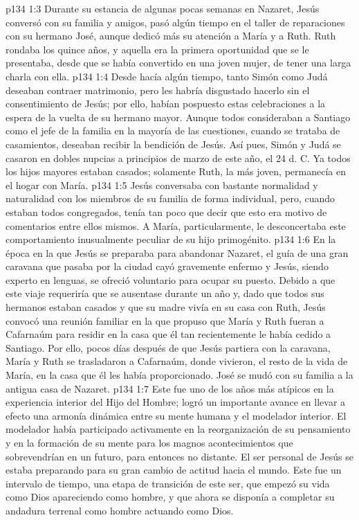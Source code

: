 \vs p134 1:3 Durante su estancia de algunas pocas semanas en Nazaret, Jesús conversó con su familia y amigos, pasó algún tiempo en el taller de reparaciones con su hermano José, aunque dedicó más su atención a María y a Ruth. Ruth rondaba los quince años, y aquella era la primera oportunidad que se le presentaba, desde que se había convertido en una joven mujer, de tener una larga charla con ella.
\vs p134 1:4 Desde hacía algún tiempo, tanto Simón como Judá deseaban contraer matrimonio, pero les habría disgustado hacerlo sin el consentimiento de Jesús; por ello, habían pospuesto estas celebraciones a la espera de la vuelta de su hermano mayor. Aunque todos consideraban a Santiago como el jefe de la familia en la mayoría de las cuestiones, cuando se trataba de casamientos, deseaban recibir la bendición de Jesús. Así pues, Simón y Judá se casaron en dobles nupcias a principios de marzo de este año, el 24 d. C. Ya todos los hijos mayores estaban casados; solamente Ruth, la más joven, permanecía en el hogar con María.
\vs p134 1:5 Jesús conversaba con bastante normalidad y naturalidad con los miembros de su familia de forma individual, pero, cuando estaban todos congregados, tenía tan poco que decir que esto era motivo de comentarios entre ellos mismos. A María, particularmente, le desconcertaba este comportamiento inusualmente peculiar de su hijo primogénito.
\vs p134 1:6 En la época en la que Jesús se preparaba para abandonar Nazaret, el guía de una gran caravana que pasaba por la ciudad cayó gravemente enfermo y Jesús, siendo experto en lenguas, se ofreció voluntario para ocupar su puesto. Debido a que este viaje requeriría que se ausentase durante un año y, dado que todos sus hermanos estaban casados y que su madre vivía en su casa con Ruth, Jesús convocó una reunión familiar en la que propuso que María y Ruth fueran a Cafarnaúm para residir en la casa que él tan recientemente le había cedido a Santiago. Por ello, pocos días después de que Jesús partiera con la caravana, María y Ruth se trasladaron a Cafarnaúm, donde vivieron, el resto de la vida de María, en la casa que él les había proporcionado. José se mudó con su familia a la antigua casa de Nazaret.
\vs p134 1:7 Este fue uno de los años más atípicos en la experiencia interior del Hijo del Hombre; logró un importante avance en llevar a efecto una armonía dinámica entre su mente humana y el modelador interior. El modelador había participado activamente en la reorganización de su pensamiento y en la formación de su mente para los magnos acontecimientos que sobrevendrían en un futuro, para entonces no distante. El ser personal de Jesús se estaba preparando para su gran cambio de actitud hacia el mundo. Este fue un intervalo de tiempo, una etapa de transición de este ser, que empezó su vida como Dios apareciendo como hombre, y que ahora se disponía a completar su andadura terrenal como hombre actuando como Dios.
